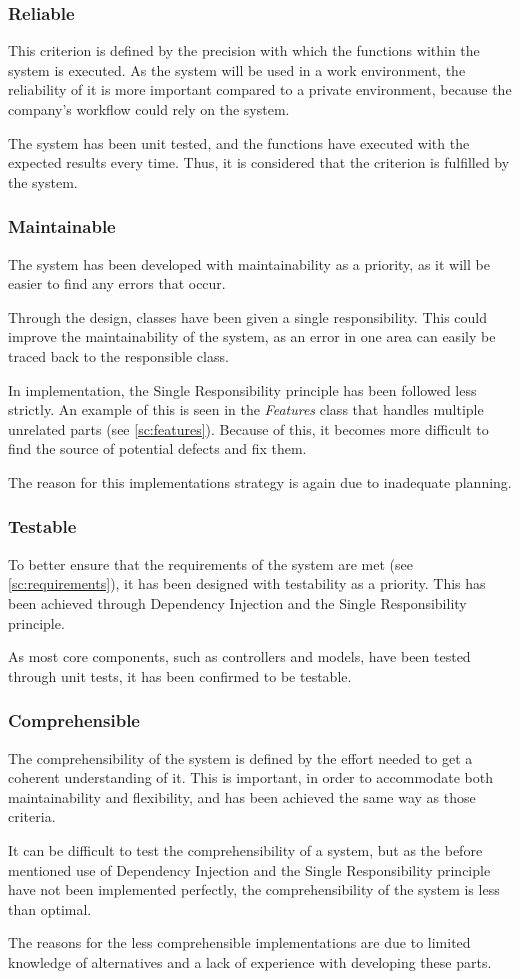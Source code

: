 \subsubsection{Reliable}
This criterion is defined by the precision with which the functions within the system is executed. As the system will be used in a work environment, the reliability of it is more important compared to a private environment, because the company's workflow could rely on the system.
\par
The system has been unit tested, and the functions have executed with the expected results every time. Thus, it is considered that the criterion is fulfilled by the system.

\subsubsection{Maintainable}
The system has been developed with maintainability as a priority, as it will be easier to find any errors that occur.
\par
Through the design, classes have been given a single responsibility. This could improve the maintainability of the system, as an error in one area can easily be traced back to the responsible class.
\par
In implementation, the Single Responsibility principle has been followed less strictly. An example of this is seen in the \textit{Features} class that handles multiple unrelated parts (see \autoref{sc:features}). Because of this, it becomes more difficult to find the source of potential defects and fix them.
\par
The reason for this implementations strategy is again due to inadequate planning.

\subsubsection{Testable}
To better ensure that the requirements of the system are met (see \autoref{sc:requirements}), it has been designed with testability as a priority. This has been achieved through Dependency Injection and the Single Responsibility principle.
\par
As most core components, such as controllers and models, have been tested through unit tests, it has been confirmed to be testable.

\subsubsection{Comprehensible}
The comprehensibility of the system is defined by the effort needed to get a coherent understanding of it. This is important, in order to accommodate both maintainability and flexibility, and has been achieved the same way as those criteria.
\par
It can be difficult to test the comprehensibility of a system, but as the before mentioned use of Dependency Injection and the Single Responsibility principle have not been implemented perfectly, the comprehensibility of the system is less than optimal.
\par
The reasons for the less comprehensible implementations are due to limited knowledge of alternatives and a lack of experience with developing these parts.